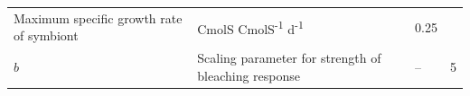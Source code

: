 \documentclass[]{elsarticle} %
\begin{document}
\begin{longtable}[c]{@{}llll@{}}
\begin{minipage}[t]{0.48\columnwidth}
Maximum specific growth rate of symbiont
\strut\end{minipage} &
\begin{minipage}[t]{0.25\columnwidth}\raggedright\strut
CmolS CmolS\textsuperscript{-1} d\textsuperscript{-1}
\strut\end{minipage} &
\begin{minipage}[t]{0.10\columnwidth}\raggedright\strut
0.25
\strut\end{minipage}\tabularnewline
\begin{minipage}[t]{0.10\columnwidth}\raggedright\strut
\(b\)
\strut\end{minipage} &
\begin{minipage}[t]{0.48\columnwidth}\raggedright\strut
Scaling parameter for strength of bleaching response
\strut\end{minipage} &
\begin{minipage}[t]{0.25\columnwidth}\raggedright\strut
--
\strut\end{minipage} &
\begin{minipage}[t]{0.10\columnwidth}\raggedright\strut
5
\strut\end{minipage}\tabularnewline
\bottomrule
\end{longtable}
\end{document}
